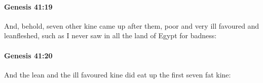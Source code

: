		\paragraph{Genesis 41:19} %
			\label{GENESIS-41-19}

			And, behold, seven other kine came up after them, poor and very ill favoured and leanfleshed, such as I never saw in all the land of Egypt for badness:


		\paragraph{Genesis 41:20} %
			\label{GENESIS-41-20}

			And the lean and the ill favoured kine did eat up the first seven fat kine:


